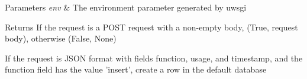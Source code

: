 \begin{DoxyParams}{Parameters}
{\em env} & The environment parameter generated by uwsgi \\
\hline
\end{DoxyParams}
\begin{DoxyReturn}{Returns}
If the request is a P\-O\-S\-T request with a non-\/empty body, (True, request body), otherwise (False, None)
\end{DoxyReturn}
If the request is J\-S\-O\-N format with fields function, usage, and timestamp, and the function field has the value 'insert', create a row in the default database 